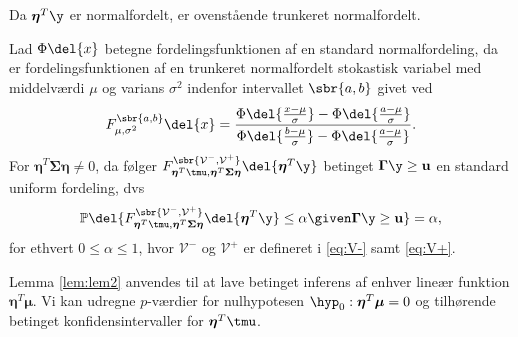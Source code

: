 Da \(\boldsymbol{\eta}^T \y\) er normalfordelt, er ovenstående trunkeret normalfordelt.
%
\begin{lem}  \label{lem:lem2}
Lad \(\Phi \del{x}\) betegne fordelingsfunktionen af en standard normalfordeling, da er fordelingsfunktionen af en trunkeret normalfordelt stokastisk variabel med middelværdi \(\mu\) og varians \(\sigma^2\) indenfor intervallet \(\sbr{a,b}\) givet ved
\begin{align*}
F_{\mu, \sigma^2}^{\sbr{a,b}} \del{x} = \frac{\Phi\del{\frac{x-\mu}{\sigma}} - \Phi\del{\frac{a-\mu}{\sigma}}}{\Phi\del{\frac{b-\mu}{\sigma}} - \Phi\del{\frac{a-\mu}{\sigma}}}.
\end{align*}
For \(\boldsymbol{\eta}^T \boldsymbol{\Sigma} \boldsymbol{\eta} \neq 0\), da følger  \(F_{\boldsymbol{\eta}^T \tmu, \boldsymbol{\eta}^T \boldsymbol{\Sigma} \boldsymbol{\eta}}^{\sbr{\mathcal{V}^-,\mathcal{V}^+}} \del{\boldsymbol{\eta}^T \y} \) betinget \(\boldsymbol{\Gamma} \y \geq \mathbf{u}\) en standard uniform fordeling, dvs
\begin{align*}
\mathbb{P} \del{F_{\boldsymbol{\eta}^T \tmu, \boldsymbol{\eta}^T \boldsymbol{\Sigma} \boldsymbol{\eta}}^{\sbr{\mathcal{V}^-,\mathcal{V}^+}} \del{\boldsymbol{\eta}^T \y} \leq \alpha \given \boldsymbol{\Gamma} \y \geq \mathbf{u}} = \alpha, 
\end{align*}
for ethvert \(0 \leq \alpha \leq 1\), hvor \(\mathcal{V}^-\) og \(\mathcal{V}^+\) er defineret i \eqref{eq:V-} samt \eqref{eq:V+}. 
\end{lem}
%
Lemma \ref{lem:lem2} anvendes til at lave betinget inferens af enhver lineær funktion \(\boldsymbol{\eta}^T \boldsymbol{\mu}\).
Vi kan udregne \(p\)-værdier for nulhypotesen \(\hyp_0: \boldsymbol{\eta}^T \boldsymbol{\mu}=0\) og tilhørende betinget konfidensintervaller for \(\boldsymbol{\eta}^T \tmu\).

